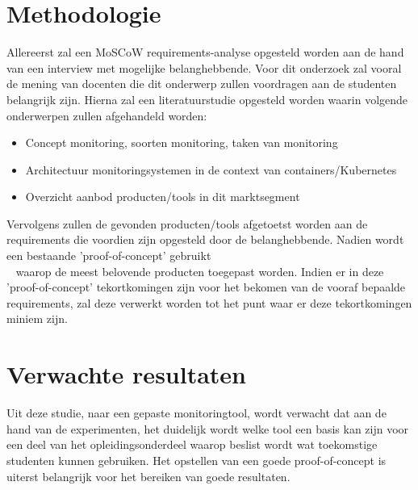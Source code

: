 
\section{Methodologie}
\label{sec:methodologie}

Allereerst zal een MoSCoW requirements-analyse opgesteld worden aan de hand van een interview met mogelijke belanghebbende. Voor dit onderzoek zal vooral de mening van docenten die dit onderwerp zullen voordragen aan de studenten belangrijk zijn. Hierna zal een literatuurstudie opgesteld worden waarin volgende onderwerpen zullen afgehandeld worden:

\begin{itemize}
    \item Concept monitoring, soorten monitoring, taken van monitoring
    \item Architectuur monitoringsystemen in de context van containers/Kubernetes
    \item Overzicht aanbod producten/tools in dit marktsegment\\
\end{itemize}

Vervolgens zullen de gevonden producten/tools afgetoetst worden aan de requirements die voordien zijn opgesteld door de belanghebbende. Nadien wordt een bestaande 'proof-of-concept' gebruikt\\~\autocite{Cedric2019} waarop de meest belovende producten toegepast worden. Indien er in deze 'proof-of-concept' tekortkomingen zijn voor het bekomen van de vooraf bepaalde requirements, zal deze verwerkt worden tot het punt waar er deze tekortkomingen miniem zijn. 

\section{Verwachte resultaten}
\label{sec:verwachte_resultaten}

Uit deze studie, naar een gepaste monitoringtool, wordt verwacht dat aan de hand van de experimenten, het duidelijk wordt welke tool een basis kan zijn voor een deel van het opleidingsonderdeel waarop beslist wordt wat toekomstige studenten kunnen gebruiken. Het opstellen van een goede proof-of-concept is uiterst belangrijk voor het bereiken van goede resultaten.

